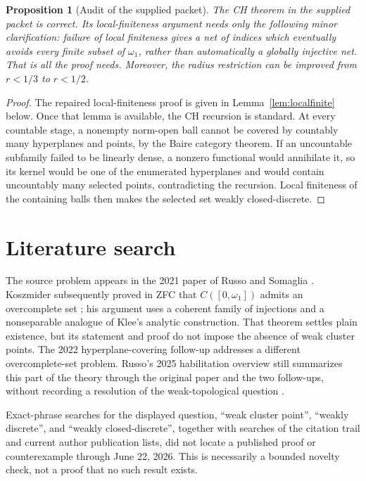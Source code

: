 \documentclass[11pt]{article}
\newtheorem{proposition}[theorem]{Proposition}
\theoremstyle{remark}
\begin{document}
\begin{proposition}[Audit of the supplied packet]
The CH theorem in the supplied packet is correct.  Its local-finiteness
argument needs only the following minor clarification: failure of local
finiteness gives a net of indices which eventually avoids every finite subset
of $\omega_1$, rather than automatically a globally injective net.  That is
all the proof needs.  Moreover, the radius restriction can be improved from
$r<1/3$ to $r<1/2$.
\end{proposition}

\begin{proof}
The repaired local-finiteness proof is given in Lemma~\ref{lem:localfinite}
below.  Once that lemma is available, the CH recursion is standard.  At every
countable stage, a nonempty norm-open ball cannot be covered by countably many
hyperplanes and points, by the Baire category theorem.  If an uncountable
subfamily failed to be linearly dense, a nonzero functional would annihilate
it, so its kernel would be one of the enumerated hyperplanes and would contain
uncountably many selected points, contradicting the recursion.  Local
finiteness of the containing balls then makes the selected set weakly
closed-discrete.
\end{proof}

\section{Literature search}

The source problem appears in the 2021 paper of Russo and Somaglia
\cite{RussoSomaglia}.  Koszmider subsequently proved in ZFC that
$C([0,\omega_1])$ admits an overcomplete set \cite[Theorem 11]{Koszmider}; his
argument uses a coherent family of injections and a nonseparable analogue of
Klee's analytic construction.  That theorem settles plain existence, but its
statement and proof do not impose the absence of weak cluster points.  The
2022 hyperplane-covering follow-up \cite{GlodkowskiKoszmider} addresses a
different overcomplete-set problem.  Russo's 2025 habilitation overview still
summarizes this part of the theory through the original paper and the two
follow-ups, without recording a resolution of the weak-topological question
\cite[pp.~16--17]{RussoHab}.

Exact-phrase searches for the displayed question, ``weak cluster point'',
``weakly discrete'', and ``weakly closed-discrete'', together with searches of
the citation trail and current author publication lists, did not locate a
published proof or counterexample through June 22, 2026.  This is necessarily a
bounded novelty check, not a proof that no such result exists.
\end{document}
